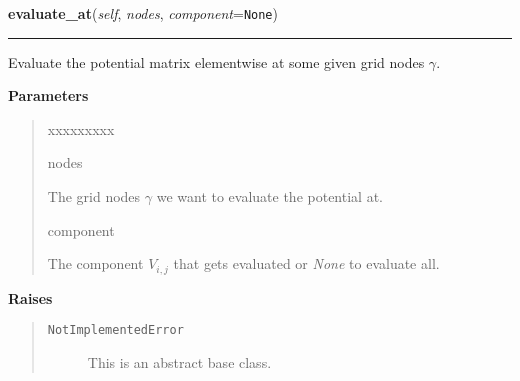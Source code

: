 \hspace{.8\funcindent}\begin{boxedminipage}{\funcwidth}

    \raggedright \textbf{evaluate\_at}(\textit{self}, \textit{nodes}, \textit{component}={\tt None})

    \vspace{-1.5ex}

    \rule{\textwidth}{0.5\fboxrule}
\setlength{\parskip}{2ex}
    Evaluate the potential matrix elementwise at some given grid nodes
    $\gamma$.

\setlength{\parskip}{1ex}
      \textbf{Parameters}
      \vspace{-1ex}

      \begin{quote}
        \begin{Ventry}{xxxxxxxxx}

          \item[nodes]

          The grid nodes $\gamma$ we want to evaluate the
          potential at.

          \item[component]

          The component $V_{i,j}$ that gets evaluated or \textit{None} to
          evaluate all.

        \end{Ventry}

      \end{quote}

      \textbf{Raises}
    \vspace{-1ex}

      \begin{quote}
        \begin{description}

          \item[\texttt{NotImplementedError}]

          This is an abstract base class.

        \end{description}

      \end{quote}

    \end{boxedminipage}

    \label{MatrixPotential:MatrixPotential:calculate_eigenvalues}

